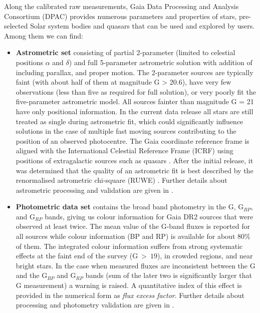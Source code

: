Along the calibrated raw measurements, Gaia Data Processing and Analysis Consortium (DPAC) provides numerous parameters and properties of stars, pre-selected Solar system bodies and quasars that can be used and explored by users. Among them we can find:
\begin{itemize}
	\item \textbf{Astrometric set} consisting of partial 2-parameter (limited to celestial positions $\alpha$ and $\delta$) and full 5-parameter astrometric solution with addition of including parallax, and proper motion. The 2-parameter sources are typically faint (with about half of them at magnitude G > 20.6), have very few observations (less than five as required for full solution), or very poorly fit the five-parameter astrometric model. All sources fainter than magnitude G = 21 have only positional information. In the current data release all stars are still treated as single during astrometric fit, which could significantly influence solutions in the case of multiple fast moving sources contributing to the position of an observed photocentre. The Gaia coordinate reference frame is aligned with the International Celestial Reference Frame (ICRF) using positions of extragalactic sources such as quasars \citep{2018A&A...616A..14G}. After the initial release, it was determined that the quality of an astrometric fit is best described by the renormalised astrometric chi-square (RUWE) \citep{ruwe}. Further details about astrometric processing and validation are given in \citet{2018A&A...616A...2L, 2018A&A...616A...9L}.
	
	\item \textbf{Photometric data set} contains the broad band photometry in the G, G$_{BP}$, and G$_{RP}$ bands, giving us colour information for Gaia DR2 sources that were observed at least twice. The mean value of the G-band fluxes is reported for all sources while colour information (BP and RP) is available for about 80$\%$ of them.	The integrated colour information suffers from strong systematic effects at the faint end of the survey (G~>~$19$), in crowded regions, and near bright stars. In the case when measured fluxes are inconsistent between the G and the G$_{BP}$ and G$_{RP}$ bands (sum of the later two is significantly larger that G measurement) a warning is raised. A quantitative index of this effect is provided in the numerical form as \textit{flux excess factor}. Further details about processing and photometry validation are given in \citet{2018A&A...616A...4E, 2018A&A...616A...3R}.
	

\end{itemize}
